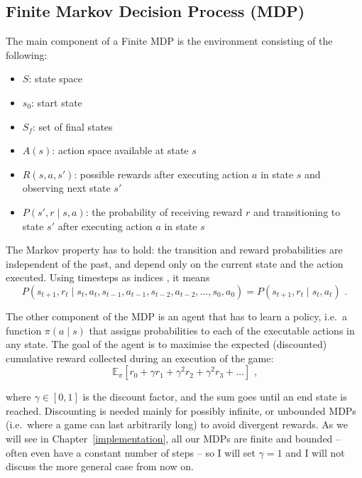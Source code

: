 \subsection{Finite Markov Decision Process (MDP)}


The main component of a Finite MDP is the environment consisting of the following:
\begin{itemize}[itemsep=0pt]
    \item $S$: state space
    \item $s_0$: start state
    \item $S_f$: set of final states
    \item $A(s)$: action space available at state $s$
    \item $R(s, a, s')$: possible rewards after executing action $a$ in state $s$ and observing next state $s'$
    \item $P(s', r \mid s, a)$: the probability of receiving reward $r$ and transitioning to state $s'$ after executing action $a$ in state $s$
\end{itemize} 


The Markov property has to hold: the transition and reward probabilities are independent of the past, and depend only on the current state and the action executed. Using timesteps as indices , it means
\begin{equation} \label{eq:MarkovProperty}
P(s_{t+1},r_{t} \mid s_{t}, a_{t}, s_{t-1}, a_{t-1}, s_{t-2}, a_{t-2}, ..., s_{0}, a_{0}) = P(s_{t+1},r_{t} \mid s_{t}, a_{t})\text{ .}
\end{equation}


The other component of the MDP is an agent that has to learn a policy, i.e.\ a function $\pi(a\mid s)$ that assigns probabilities to each of the executable actions in any state. The goal of the agent is to maximise the expected (discounted) cumulative reward collected during an execution of the game:
\begin{equation}\label{eq:cumReward}
\mathbb{E}_{\pi}[r_{0} + \gamma r_{1} + \gamma^2 r_{2} + \gamma^2 r_{3} + \ldots]\text{ ,}
\end{equation}

where $\gamma \in [0, 1]$ is the discount factor, and the sum goes until an end state is reached. Discounting is needed mainly for possibly infinite, or unbounded MDPs (i.e.\ where a game can last arbitrarily long) to avoid divergent rewards. As we will see in Chapter~\ref{implementation}, all our MDPs are finite and bounded -- often even have a constant number of steps -- so I will set $\gamma=1$ and I will not discuss the more general case from now on. 


